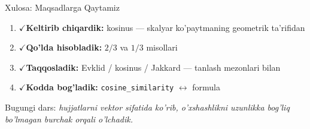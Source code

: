 \documentclass[aspectratio=169,11pt]{beamer}
\newcommand{\bajarildi}{{\color{deepgreen}\large$\checkmark$}\;}
\begin{document}
\begin{frame}{Xulosa: Maqsadlarga Qaytamiz}
  \begin{enumerate}\setlength\itemsep{6pt}
    \item \bajarildi \textbf{Keltirib chiqardik:} kosinus ---
          skalyar ko'paytmaning geometrik ta'rifidan
    \item \bajarildi \textbf{Qo'lda hisobladik:} $2/3$ va $1/3$
          misollari
    \item \bajarildi \textbf{Taqqosladik:} Evklid / kosinus /
          Jakkard --- tanlash mezonlari bilan
    \item \bajarildi \textbf{Kodda bog'ladik:}
          \texttt{cosine\_similarity} $\leftrightarrow$ formula
  \end{enumerate}
  \vspace{0.3em}
  \begin{tcolorbox}[defbox,title=Bitta gap bilan]
    \small Bugungi dars: \textit{hujjatlarni vektor sifatida ko'rib,
    o'xshashlikni uzunlikka bog'liq bo'lmagan burchak orqali o'lchadik.}
  \end{tcolorbox}
\end{frame}
\end{document}
